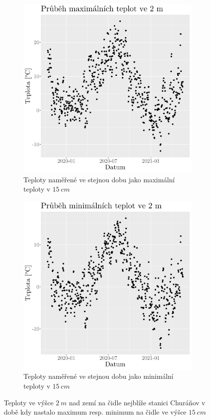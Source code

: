 \begin{figure}
	\centering
	\begin{subfigure}{0.45\textwidth}
  \includegraphics[width=\textwidth]{img/2mmaxtempmax15cm.png}
		\caption{Teploty naměřené ve stejnou dobu jako maximální teploty v $\SI{15}{cm}$}
		\label{fig:2mmaxtempmax15cm}
	\end{subfigure}
	\hfill
	\begin{subfigure}{0.45\textwidth}
  \includegraphics[width=\textwidth]{img/2mmaxtempmin15cm.png}
		\caption{Teploty naměřené ve stejnou dobu jako minimální teploty v $\SI{15}{cm}$}
		\label{fig:2mmaxtempmin15cm}
	\end{subfigure}
	\caption{Teploty ve výšce $\SI{2}{m}$ nad zemí na čidle nejblíže stanici Churáňov v době kdy nastalo maximum resp. minimum na čidle ve výšce $\SI{15}{cm}$}
	\label{fig:2mhours}
\end{figure}

